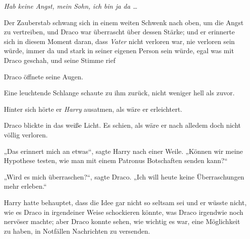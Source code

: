 \emph{Hab keine Angst, mein Sohn, ich bin ja da …}

Der Zauberstab schwang sich in einem weiten Schwenk nach oben, um die Angst zu vertreiben, und Draco war überrascht über dessen Stärke; und er erinnerte sich in diesem Moment daran, dass \emph{Vater} nicht verloren war, nie verloren sein würde, immer da und stark in seiner eigenen Person sein würde, egal was mit Draco geschah, und seine Stimme rief 

Draco öffnete seine Augen.

Eine leuchtende Schlange schaute zu ihm zurück, nicht weniger hell als zuvor.

Hinter sich hörte er \emph{Harry} ausatmen, als wäre er erleichtert.

Draco blickte in das weiße Licht. Es schien, als wäre er nach alledem doch nicht völlig verloren.

„Das erinnert mich an etwas“, sagte Harry nach einer Weile.
„Können wir meine Hypothese testen, wie man mit einem Patronus Botschaften senden kann?“

„Wird es mich überraschen?“, sagte Draco.
„Ich will heute keine Überraschungen mehr erleben.“

\later

Harry hatte behauptet, dass die Idee gar nicht so seltsam sei und er wüsste nicht, wie es Draco in irgendeiner Weise schockieren könnte, was Draco irgendwie noch nervöser machte; aber Draco konnte sehen, wie wichtig es war, eine Möglichkeit zu haben, in Notfällen Nachrichten zu versenden.

